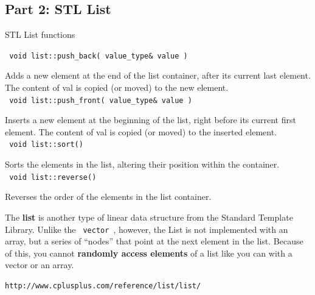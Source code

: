 \documentclass[a4paper,12pt]{book}
\begin{document}
            \subsection*{Part 2: STL List}

                \begin{intro}{STL List functions}

                    \footnotesize
                    
                    \texttt{ void list::push\_back( value\_type\&  value ) }

                        Adds a new element at the end of the list container, after its current last element.
                        The content of val is copied (or moved) to the new element. \\
                    
                    \texttt{ void list::push\_front( value\_type\&  value ) }

                        Inserts a new element at the beginning of the list, right before its current first element.
                        The content of val is copied (or moved) to the inserted element. \\
                    
                    \texttt{ void list::sort() }

                        Sorts the elements in the list, altering their position within the container. \\
                    
                    \texttt{ void list::reverse() }

                        Reverses the order of the elements in the list container. \\
                    

                    
                \end{intro}




            
                The \textbf{ list } is another type of linear data
                structure from the Standard Template Library. Unlike
                the \texttt{ vector }, however, the List is not implemented
                with an array, but a series of ``nodes'' that point at the
                next element in the list. Because of this, you cannot
                \textbf{ randomly access elements } of a list like you can
                with a vector or an array.
\begin{verbatim}
http://www.cplusplus.com/reference/list/list/
\end{verbatim}
\end{document}
